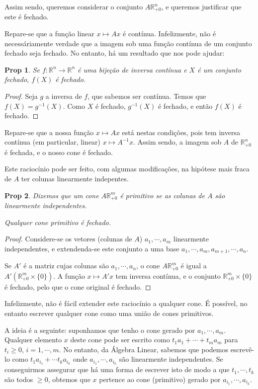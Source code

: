 \documentclass{article}
\newcommand{\R}{\mathbb{R}}
\newtheorem{prop}{Prop}
\theoremstyle{definition}
\begin{document}
	Assim sendo, queremos considerar o conjunto $A \R^n_{+0}$, e queremos justificar que este é fechado.
	
	Repare-se que a função linear $x \mapsto Ax$ é contínua. Infelizmente, não é necessáriamente verdade que a imagem sob uma função contínua de um conjunto fechado seja fechado. No entanto, há um resultado que nos pode ajudar:
	
	\begin{prop}
	Se $f : \R^n \rightarrow \R^n$ é uma bijeção de inversa contínua e $X$ é um conjunto fechado, $f(X)$ é fechado.
	\end{prop}
	
	\begin{proof}
	Seja $g$ a inversa de $f$, que sabemos ser contínua. Temos que $f(X) = g^{-1}(X)$. Como $X$ é fechado, $g^{-1}(X)$ é fechado, e então $f(X)$ é fechado.
	\end{proof}
	
	Repare-se que a nossa função $x \mapsto Ax$ está nestas condições, pois tem inversa contínua (em particular, linear) $x \mapsto A^{-1} x$. Assim sendo, a imagem sob $A$ de $\R^n_{+0}$ é fechada, e o nosso cone é fechado.
	
	Este raciocínio pode ser feito, com algumas modificações, na hipótese mais fraca de $A$ ter colunas linearmente indepentes.
	
	\begin{prop}
	Dizemos que um cone $A \R^m_{+0}$ é \emph{primitivo} se as colunas de $A$ são linearmente independentes.
	
	Qualquer cone primitivo é fechado.
	\end{prop}
	
	\begin{proof}
	Considere-se os vetores (colunas de $A$) $a_1, \cdots, a_m$ linearmente independentes, e extendenda-se este conjunto a uma base $a_1, \cdots, a_m, a_{m+1}, \cdots, a_n$.
	
	Se $A'$ é a matriz cujas colunas são $a_1, \cdots, a_n$, o cone $A \R^m_{+0}$ é igual a \allowbreak ${A' (\R^m_{+0} \times \{0\})}$. A função $x \mapsto A'x$ tem inversa contínua, e o conjunto $\R^m_{+0} \times \{0\}$ é fechado, pelo que o cone original é fechado.
	\end{proof}
	
	Infelizmente, não é fácil extender este raciocínio a qualquer cone. É possível, no entanto escrever qualquer cone como uma união de cones primitivos.
	
	A ideia é a seguinte: suponhamos que tenho o cone gerado por $a_1, \cdots, a_m$. Qualquer elemento $x$ deste cone pode ser escrito como $t_1 a_1 + \cdots + t_m a_m$ para $t_i \geq 0$, $i = 1, \cdots, m$. No entanto, da Álgebra Linear, sabemos que podemos escrevê-lo como $t_1 a_{i_1} + \cdots t_k a_{i_k}$ onde $a_{i_1}, \cdots, a_{i_k}$ são linearmente independentes. Se conseguirmos assegurar que há uma forma de escrever isto de modo a que $t_1, \cdots, t_k$ são todos $\geq 0$, obtemos que $x$ pertence ao cone (primitivo) gerado por $a_{i_1}, \cdots, a_{i_k}$.
	
\end{document}
